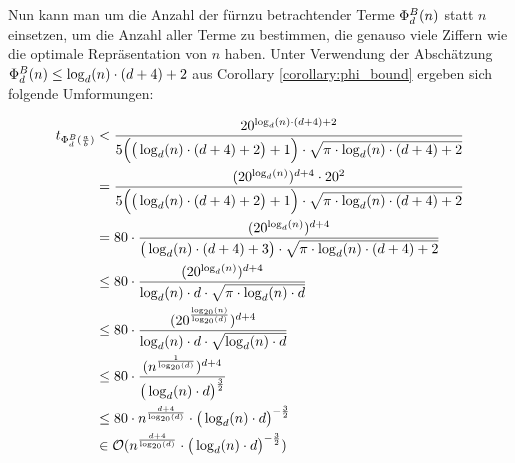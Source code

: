 \documentclass{article}
\theoremstyle{nonumberplain}
\begin{document}
Nun kann man um die Anzahl der fürnzu betrachtender Terme \(\Phi_{d}^{B}(n)\) statt \(n\) einsetzen, um die Anzahl aller Terme zu bestimmen, die genauso viele Ziffern wie die optimale Repräsentation von \(n\) haben.
Unter Verwendung der Abschätzung \(\Phi_{d}^{B}(n) \leq \log_d(n) \cdot (d+4) + 2\) aus Corollary \ref{corollary:phi_bound} ergeben sich folgende Umformungen:

\begin{align*}
    t_{\Phi_{d}^{B}(\frac{a}{b})}
    &< \frac{20^{\log_d(n)\cdot(d+4)+2}}{5\Big(\big(\log_d(n) \cdot (d+4)+2\big)+1\Big) \cdot \sqrt{\pi \cdot \log_d(n) \cdot (d+4) + 2}} \\
    &= \frac{(20^{\log_d(n)})^{d+4}\cdot20^2}{5\Big(\big(\log_d(n) \cdot (d+4)+2\big)+1\Big) \cdot \sqrt{\pi \cdot \log_d(n) \cdot (d + 4) + 2}} \\
    &= 80\cdot\frac{(20^{\log_d(n)})^{d+4}}{\big(\log_d(n) \cdot (d+4)+3\big) \cdot\sqrt{\pi \cdot \log_d(n)\cdot(d+4)+2}} \\
    &\leq 80\cdot\frac{(20^{\log_d(n)})^{d+4}}{\log_d(n) \cdot d \cdot \sqrt{\pi \cdot \log_d(n) \cdot d}} \\
    &\leq 80\cdot\frac{(20^{\frac{\log_{20}(n)}{\log_{20}(d)}})^{d+4}}{\log_d(n) \cdot d \cdot \sqrt{\log_d(n) \cdot d}} \\
    &\leq 80\cdot\frac{(n^{\frac{1}{\log_{20}(d)}})^{d+4}}{\big(\log_d(n) \cdot d\big)^{\frac{3}{2}}} \\
    &\leq 80 \cdot n^{\frac{d+4}{\log_{20}(d)}} \cdot \big(\log_d(n) \cdot d\big)^{-\frac{3}{2}} \\
    &\in \mathcal{O}(n^{\frac{d+4}{\log_{20}(d)}} \cdot \big(\log_d(n) \cdot d\big)^{-\frac{3}{2}}) \\
\end{align*}
\end{document}
